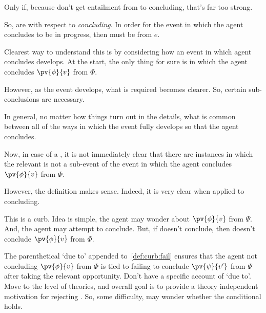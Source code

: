 \begin{note}
  {
    \color{red}
    Only if, because don't get entailment from \pevent{} to concluding, that's far too strong.
  }

  So,  are with respect to \emph{concluding}.
  In order for the event in which the agent concludes to be in progress, then must be \pevent{} from \(e\).

  Clearest way to understand this is by considering how an event in which agent concludes develops.
  At the start, the only thing for sure is \pevent{} in which the agent concludes \(\pv{\phi}{v}\) from \(\Phi\).

  However, as the event develops, what is required becomes clearer.
  So, certain sub-conclusions are necessary.

  In general, no matter how things turn out in the details, what is common between all of the ways in which the event fully develops so that the agent concludes.
\end{note}

\begin{note}
  Now, in case of a \curb{}, it is not immediately clear that there are instances in which the relevant \pevent{} is not a sub-event of the event in which the agent concludes \(\pv{\phi}{v}\) from \(\Phi\).

  However, the definition makes sense.
  Indeed, it is very clear when applied to concluding.
\end{note}

\begin{note}
  This is a curb.
  Idea is simple, the agent may wonder about \(\pv{\phi}{v}\) from \(\Psi\).
  And, the agent may attempt to conclude.
  But, if doesn't conclude, then doesn't conclude \(\pv{\phi}{v}\) from \(\Phi\).
\end{note}

\begin{note}
  The parenthetical `due to' appended to~\ref{def:curb:fail} ensures that the agent not concluding \(\pv{\phi}{v}\) from \(\Phi\) is tied to failing to conclude \(\pv{\psi}{v'}\) from \(\Psi\) after taking the relevant opportunity.
  Don't have a specific account of `due to'.
  Move to the level of theories, and overall goal is to provide a theory independent motivation for rejecting \issueConstraint{}.
  So, some difficulty, may wonder whether the conditional holds.
\end{note}

\section{}
\label{sec:illu3}

